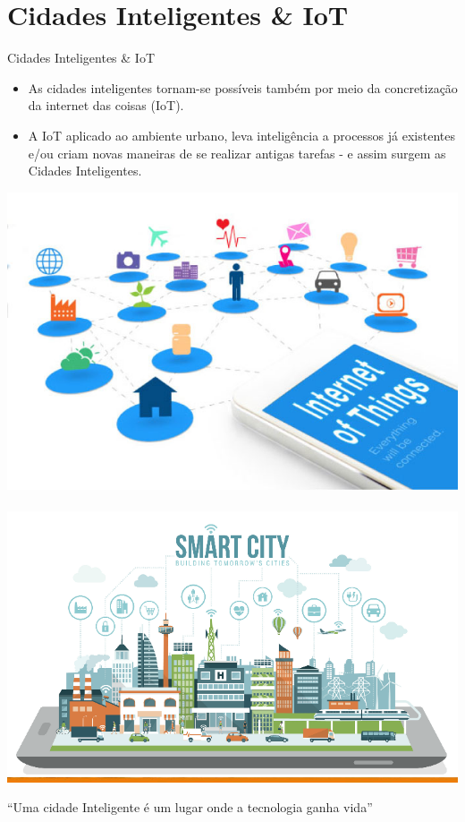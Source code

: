 \documentclass{beamer}
\begin{document}
\section{Cidades Inteligentes \& IoT}
\begin{frame}{Cidades Inteligentes \& IoT}
\begin{block}
 
\begin{itemize}
\item As cidades inteligentes tornam-se possíveis também por meio da
concretização da internet das coisas (IoT). 
\item A IoT aplicado ao ambiente urbano, leva
inteligência a processos já existentes e/ou criam novas
maneiras de se realizar antigas tarefas - e assim surgem
as Cidades Inteligentes.
 
\end{itemize}
\end{block}
\begin{center}
\includegraphics[width=.3\textwidth]{img/IOT4.jpg}\ \ \ \ \ \ \ \ \ \ \ \ \ \ \ \ \  
\includegraphics[width=.3\textwidth]{img/smartcity.png}
 
 
\end{center}


\begin{exampleblock}{} 
``Uma cidade Inteligente é um lugar onde a tecnologia ganha vida''
\end{exampleblock}

\end{frame}
\end{document}
